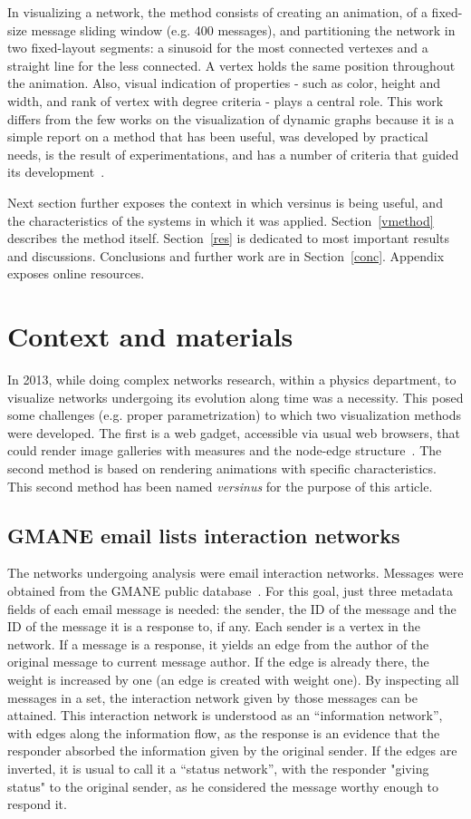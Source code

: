 \documentclass[%
 aip,
 jmp,%
 amsmath,amssymb,
 reprint,%
]{revtex4-1}
\begin{document}
In visualizing a network, the method consists of creating an animation,
of a fixed-size message sliding window (e.g. 400 messages), and 
partitioning the network in two fixed-layout segments:
a sinusoid for the most connected vertexes
and a straight line for the less connected.
A vertex holds the same position throughout the animation. Also,
visual indication of properties - such as color, height and width,
and rank of vertex with degree criteria - plays a central role.
This work differs from the few works on the visualization of dynamic
graphs because it is a simple report on a method that has been useful,
was developed by practical needs, is the result of experimentations,
and has a number of criteria that guided its development~\cite{Viz1,Viz2,Viz3}.

Next section further exposes the context in which versinus is being useful,
and the characteristics of the systems in which it was applied.
Section~\ref{vmethod} describes the method itself. Section~\ref{res} is dedicated
to most important results and discussions. Conclusions and further work
are in Section~\ref{conc}. Appendix exposes online resources.


\section{Context and materials}\label{cmaterials}
In 2013, while doing complex networks research, within a physics department,
to visualize networks undergoing its evolution along time was a necessity.
This posed some challenges (e.g. proper parametrization) to which two
visualization methods were developed. The first is a web gadget, accessible via
usual web browsers, that could render image galleries with
measures and the node-edge structure~\cite{galGMANE, appGMANE}.
The second method 
is based on rendering animations with specific characteristics.
This second method has been named \emph{versinus} for the purpose of this article.

\subsection{GMANE email lists interaction networks}\label{intNet}
The networks undergoing analysis were email interaction networks.
Messages were obtained from the GMANE public database~\cite{GMANE,GMANE2,GMANEwikipedia}. For this goal, just three metadata fields of each email message is needed: the sender, the ID of the message and the ID of the message it is a response to, if any. Each sender is a vertex in the network. If a message is a response, it yields an edge from the author of the original message to current message author. If the edge is already there, the weight is increased by one (an edge is created with weight one). By inspecting all messages in a set, the interaction network given by those messages can be attained. This interaction network is understood as an ``information network'', with edges along the information flow, as the response is an evidence that the responder absorbed the information given by the original sender. If the edges are inverted, it is usual to call it a ``status network'', with the responder "giving status" to the original sender, as he considered the message worthy enough to respond it.
\end{document}
